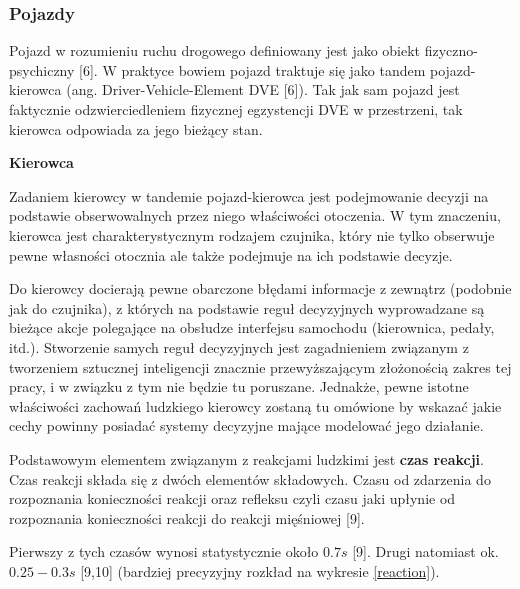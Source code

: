 {\subsubsection{Pojazdy}
\par{
Pojazd w rozumieniu ruchu drogowego definiowany jest jako obiekt fizyczno-psychiczny [6]. W praktyce bowiem pojazd traktuje się jako tandem pojazd-kierowca (ang. Driver-Vehicle-Element DVE [6]). Tak jak sam pojazd jest faktycznie odzwierciedleniem fizycznej egzystencji DVE w przestrzeni, tak kierowca odpowiada za jego bieżący stan.
}
\par{ }
\par{
\textbf{Kierowca}
}
\par{
Zadaniem kierowcy w tandemie pojazd-kierowca jest podejmowanie decyzji na podstawie obserwowalnych przez niego właściwości otoczenia. W tym znaczeniu, kierowca jest charakterystycznym rodzajem czujnika, który nie tylko obserwuje pewne własności otocznia ale także podejmuje na ich podstawie decyzje.
}
\par{
Do kierowcy docierają pewne obarczone błędami informacje z zewnątrz (podobnie jak do czujnika), z których na podstawie reguł decyzyjnych wyprowadzane są bieżące akcje polegające na obsłudze interfejsu samochodu (kierownica, pedały, itd.). Stworzenie samych reguł decyzyjnych jest zagadnieniem związanym z tworzeniem sztucznej inteligencji znacznie przewyższającym złożonością zakres tej pracy, i w związku z tym nie będzie tu poruszane. Jednakże, pewne istotne właściwości zachowań ludzkiego kierowcy zostaną tu omówione by wskazać jakie cechy powinny posiadać systemy decyzyjne mające modelować jego działanie.
}
\par{
Podstawowym elementem związanym z reakcjami ludzkimi jest \textbf{czas reakcji}. Czas reakcji składa się z dwóch elementów składowych. Czasu od zdarzenia do rozpoznania konieczności reakcji oraz refleksu czyli czasu jaki upłynie od rozpoznania konieczności reakcji do reakcji mięśniowej [9].
}
\par{
Pierwszy z tych czasów wynosi statystycznie około $0.7s$ [9]. Drugi natomiast ok. $0.25-0.3s$ [9,10] (bardziej precyzyjny rozkład na wykresie \ref{reaction}).
}
\begin{figure}[htb]
    \begin{center}

\end{center}
\end{figure}}
